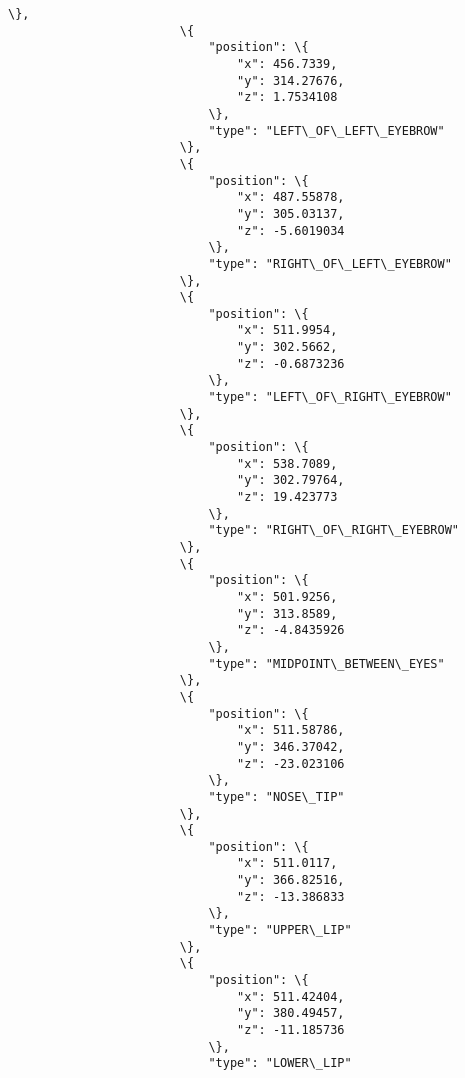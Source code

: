 \documentclass[11pt]{article}
\begin{document}
\begin{Verbatim}[commandchars=\\\{\}]
                        \},
                        \{
                            "position": \{
                                "x": 456.7339,
                                "y": 314.27676,
                                "z": 1.7534108
                            \},
                            "type": "LEFT\_OF\_LEFT\_EYEBROW"
                        \},
                        \{
                            "position": \{
                                "x": 487.55878,
                                "y": 305.03137,
                                "z": -5.6019034
                            \},
                            "type": "RIGHT\_OF\_LEFT\_EYEBROW"
                        \},
                        \{
                            "position": \{
                                "x": 511.9954,
                                "y": 302.5662,
                                "z": -0.6873236
                            \},
                            "type": "LEFT\_OF\_RIGHT\_EYEBROW"
                        \},
                        \{
                            "position": \{
                                "x": 538.7089,
                                "y": 302.79764,
                                "z": 19.423773
                            \},
                            "type": "RIGHT\_OF\_RIGHT\_EYEBROW"
                        \},
                        \{
                            "position": \{
                                "x": 501.9256,
                                "y": 313.8589,
                                "z": -4.8435926
                            \},
                            "type": "MIDPOINT\_BETWEEN\_EYES"
                        \},
                        \{
                            "position": \{
                                "x": 511.58786,
                                "y": 346.37042,
                                "z": -23.023106
                            \},
                            "type": "NOSE\_TIP"
                        \},
                        \{
                            "position": \{
                                "x": 511.0117,
                                "y": 366.82516,
                                "z": -13.386833
                            \},
                            "type": "UPPER\_LIP"
                        \},
                        \{
                            "position": \{
                                "x": 511.42404,
                                "y": 380.49457,
                                "z": -11.185736
                            \},
                            "type": "LOWER\_LIP"

\end{Verbatim}
\end{document}
